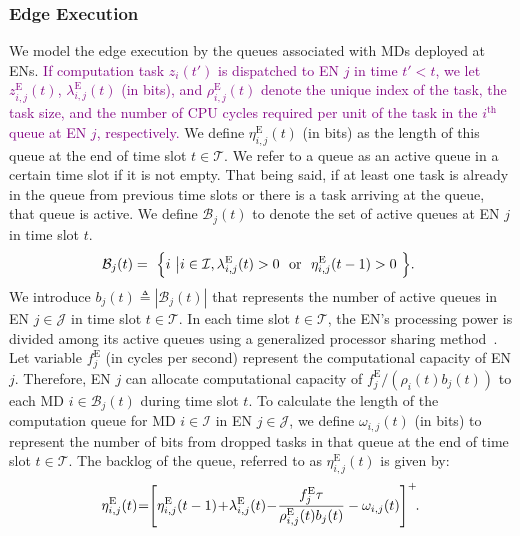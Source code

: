 \documentclass[10pt, journal,letterpaper]{IEEEtran}
\begin{document}
\subsubsection{Edge Execution}
We model the edge execution by the queues associated with MDs deployed at ENs. \textcolor{purple}{If computation task $z_i(t')$ is dispatched to EN $j$ in time $t' < t$, we let $z_{i,j}^{\text{E}}(t)$, $\lambda_{i,j}^{\text{E}}(t)$ (in bits), and $\rho_{i,j}^{\text{E}}(t)$ denote the unique index of the task, the task size, and the number of CPU cycles required per unit of the task in the $i^{\text{th}}$ queue at EN $j$, respectively. } We define $\eta_{i,j}^{\text{E}}(t)$ (in bits) as the length of this queue at the end of time slot $t \in \mathcal{T}$. We refer to a queue as an active queue in a certain time slot if it is not empty. That being said, if at least one task is already in the queue from previous time slots or there is a task arriving at the queue, that queue is active. We define $\mathcal{B}_j(t)$ to denote the set of active queues at EN $j$ in time slot $t$.
\begin{alignat}{1}
	\mathcal{B}_j(t) = \textcolor{white}{i}\Big\{i \textcolor{white}{i}\big| i \in \mathcal{I}, \lambda_{i,j}^{\text{E}}(t)>0\,\, \textcolor{white}{i}\text{or}\textcolor{white}{i} \,\, \eta_{i,j}^{\text{E}}(t-1)>0\textcolor{white}{i}\Big\}.\textcolor{white}{i}
	\label{9}  
\end{alignat}
We introduce $b_j(t) \triangleq |\mathcal{B}_j(t)|$ that represents the number of active queues in EN $j \in \mathcal{J}$ in time slot $t \in \mathcal{T}$. In each time slot $t \in \mathcal{T}$, the EN's processing power is divided among its active queues using a generalized processor sharing method~\cite{parekh1993generalized}. Let variable $f_j^{\text{E}}$ (in cycles per second) represent the computational capacity of EN $j$. Therefore, EN $j$ can allocate computational capacity of $f_j^{\text{E}}/(\rho_i(t) b_j(t))$ to each MD $i \in \mathcal{B}_j(t)$ during time slot $t$. To calculate the length of the computation queue for MD $i \in \mathcal{I}$ in EN $j \in \mathcal{J}$, we define $\omega_{i,j}(t)$ (in bits) to represent the number of bits from dropped tasks in that queue at the end of time slot $t \in \mathcal{T}$. The backlog of the queue, referred to as $\eta_{i,j}^{\text{E}}(t)$ is given by:
\begin{alignat}{1}
	\eta_{i,j}^{\text{E}}(t)\hspace{-0.8mm}=\hspace{-1mm}\left[\eta_{i,j}^{\text{E}}(t-1)\hspace{-0.6mm}+\hspace{-0.7mm}\lambda_{i,j}^{\text{E}}(t)\hspace{-0.7mm}-\hspace{-0.7mm}{f_j^{\text{E}}\tau\over \rho_{i,j}^{\text{E}}(t)b_j(t)} -\omega_{i,j}(t)\right]^+\hspace{-1mm}.
	\label{10}  
\end{alignat}
\end{document}
